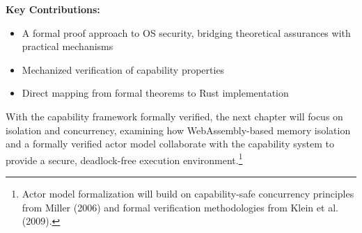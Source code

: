 \textbf{Key Contributions:}
\begin{itemize}
\item A formal proof approach to OS security, bridging theoretical assurances with practical mechanisms
\item Mechanized verification of capability properties
\item Direct mapping from formal theorems to Rust implementation
\end{itemize}

With the capability framework formally verified, the next chapter will focus on isolation and concurrency, examining how WebAssembly-based memory isolation and a formally verified actor model collaborate with the capability system to provide a secure, deadlock-free execution environment.\footnote{Actor model formalization will build on capability-safe concurrency principles from Miller (2006) and formal verification methodologies from Klein et al. (2009).}

\newpage


